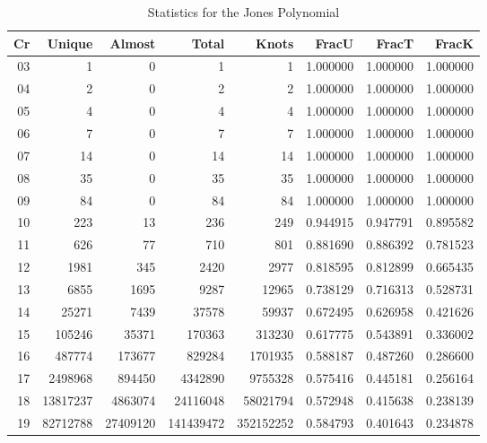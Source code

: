 \documentclass{article}
\theoremstyle{plain}
\begin{document}
        \begin{table}
            \centering
            \begin{tabular}{| r | r | r | r | r | r | r | r |}
                \hline
                Cr &  Unique  &  Almost  &   Total   &   Knots    &  FracU   &  FracT   &  FracK\\
                \hline
                03 &        1 &        0 &         1 &         1 & 1.000000 & 1.000000 & 1.000000\\
                04 &        2 &        0 &         2 &         2 & 1.000000 & 1.000000 & 1.000000\\
                05 &        4 &        0 &         4 &         4 & 1.000000 & 1.000000 & 1.000000\\
                06 &        7 &        0 &         7 &         7 & 1.000000 & 1.000000 & 1.000000\\
                07 &       14 &        0 &        14 &        14 & 1.000000 & 1.000000 & 1.000000\\
                08 &       35 &        0 &        35 &        35 & 1.000000 & 1.000000 & 1.000000\\
                09 &       84 &        0 &        84 &        84 & 1.000000 & 1.000000 & 1.000000\\
                10 &      223 &       13 &       236 &       249 & 0.944915 & 0.947791 & 0.895582\\
                11 &      626 &       77 &       710 &       801 & 0.881690 & 0.886392 & 0.781523\\
                12 &     1981 &      345 &      2420 &      2977 & 0.818595 & 0.812899 & 0.665435\\
                13 &     6855 &     1695 &      9287 &     12965 & 0.738129 & 0.716313 & 0.528731\\
                14 &    25271 &     7439 &     37578 &     59937 & 0.672495 & 0.626958 & 0.421626\\
                15 &   105246 &    35371 &    170363 &    313230 & 0.617775 & 0.543891 & 0.336002\\
                16 &   487774 &   173677 &    829284 &   1701935 & 0.588187 & 0.487260 & 0.286600\\
                17 &  2498968 &   894450 &   4342890 &   9755328 & 0.575416 & 0.445181 & 0.256164\\
                18 & 13817237 &  4863074 &  24116048 &  58021794 & 0.572948 & 0.415638 & 0.238139\\
                19 & 82712788 & 27409120 & 141439472 & 352152252 & 0.584793 & 0.401643 & 0.234878\\
                \hline
            \end{tabular}
            \caption{Statistics for the Jones Polynomial}
            \label{tab:jones_stat}
        \end{table}
\end{document}
